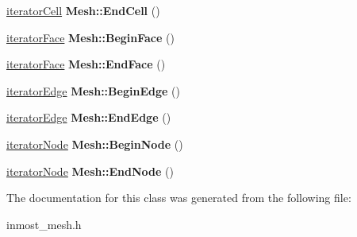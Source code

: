 \begin{DoxyCompactItemize}
\item 
\hypertarget{classINMOST_1_1Mesh_1_1base__iterator_a40cec03b434c21da6b4f3956ce4db095}{\hyperlink{classINMOST_1_1Mesh_1_1base__iterator}{iterator\-Cell} {\bfseries Mesh\-::\-End\-Cell} ()}\label{classINMOST_1_1Mesh_1_1base__iterator_a40cec03b434c21da6b4f3956ce4db095}

\item 
\hypertarget{classINMOST_1_1Mesh_1_1base__iterator_a6632423ad3c8ddd98c28ff7e79350115}{\hyperlink{classINMOST_1_1Mesh_1_1base__iterator}{iterator\-Face} {\bfseries Mesh\-::\-Begin\-Face} ()}\label{classINMOST_1_1Mesh_1_1base__iterator_a6632423ad3c8ddd98c28ff7e79350115}

\item 
\hypertarget{classINMOST_1_1Mesh_1_1base__iterator_a577c85aa5221223cbaa7f7160a98541c}{\hyperlink{classINMOST_1_1Mesh_1_1base__iterator}{iterator\-Face} {\bfseries Mesh\-::\-End\-Face} ()}\label{classINMOST_1_1Mesh_1_1base__iterator_a577c85aa5221223cbaa7f7160a98541c}

\item 
\hypertarget{classINMOST_1_1Mesh_1_1base__iterator_ab4f08fbacc97e19eef3e2c77991b129d}{\hyperlink{classINMOST_1_1Mesh_1_1base__iterator}{iterator\-Edge} {\bfseries Mesh\-::\-Begin\-Edge} ()}\label{classINMOST_1_1Mesh_1_1base__iterator_ab4f08fbacc97e19eef3e2c77991b129d}

\item 
\hypertarget{classINMOST_1_1Mesh_1_1base__iterator_a25eb7f1127f5744c62f8dd652006f78e}{\hyperlink{classINMOST_1_1Mesh_1_1base__iterator}{iterator\-Edge} {\bfseries Mesh\-::\-End\-Edge} ()}\label{classINMOST_1_1Mesh_1_1base__iterator_a25eb7f1127f5744c62f8dd652006f78e}

\item 
\hypertarget{classINMOST_1_1Mesh_1_1base__iterator_a5094383ca2a8cff6c20e7cf8867d6def}{\hyperlink{classINMOST_1_1Mesh_1_1base__iterator}{iterator\-Node} {\bfseries Mesh\-::\-Begin\-Node} ()}\label{classINMOST_1_1Mesh_1_1base__iterator_a5094383ca2a8cff6c20e7cf8867d6def}

\item 
\hypertarget{classINMOST_1_1Mesh_1_1base__iterator_a6d6fc4d1b1d711a1a6be638c495fdd1d}{\hyperlink{classINMOST_1_1Mesh_1_1base__iterator}{iterator\-Node} {\bfseries Mesh\-::\-End\-Node} ()}\label{classINMOST_1_1Mesh_1_1base__iterator_a6d6fc4d1b1d711a1a6be638c495fdd1d}

\end{DoxyCompactItemize}


The documentation for this class was generated from the following file\-:\begin{DoxyCompactItemize}
\item 
inmost\-\_\-mesh.\-h\end{DoxyCompactItemize}
